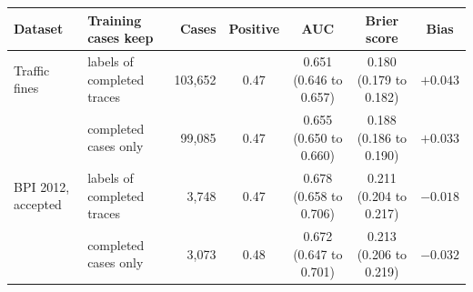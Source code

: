 \begin{tabular}{llrcccc}
\toprule
Dataset & Training cases keep & Cases & Positive & AUC & Brier score & Bias \\
\midrule
Traffic fines & labels of completed traces & 103,652 & 0.47 & 0.651 (0.646 to 0.657) & 0.180 (0.179 to 0.182) & $+0.043$ \\
 & completed cases only & 99,085 & 0.47 & 0.655 (0.650 to 0.660) & 0.188 (0.186 to 0.190) & $+0.033$ \\
\addlinespace
BPI 2012, accepted & labels of completed traces & 3,748 & 0.47 & 0.678 (0.658 to 0.706) & 0.211 (0.204 to 0.217) & $-0.018$ \\
 & completed cases only & 3,073 & 0.48 & 0.672 (0.647 to 0.701) & 0.213 (0.206 to 0.219) & $-0.032$ \\
\bottomrule
\end{tabular}
